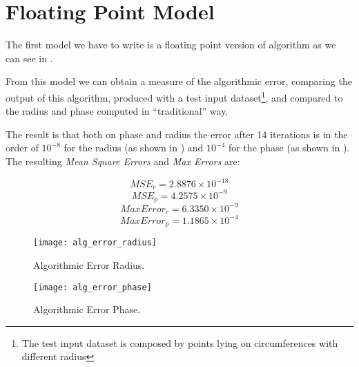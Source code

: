 \section{Floating Point Model}\label{sec:float}

The first model we have to write is a floating point version of \cordic{}
algorithm as we can see in .



From this model we can obtain a measure of the algorithmic error, comparing the
output of this algorithm, produced with a test input dataset\footnote{The test
input dataset is composed by points lying on circumferences with different
radius}, and compared to the radius and phase computed in ``traditional'' way.

The result is that both on phase and radius the error after 14 iterations is in
the order of \(10^{-8}\) for the radius (as shown in
) and \(10^{-4}\) for the phase (as shown in
). The resulting \emph{Mean Square Errors} and
\emph{Max Errors} are:

\[MSE_r = 2.8876\times10^{-18}\]
\[MSE_p = 4.2575\times10^{-9}\]
\[MaxError_r = 6.3350\times10^{-9}\]
\[MaxError_p = 1.1865\times10^{-4}\]


\begin{figure}[htb]
	\texttt{[image: alg\_error\_radius]}
	\caption{Algorithmic Error Radius.}\label{fig:floaterrorradius}
\end{figure}
\begin{figure}[htb]
	\texttt{[image: alg\_error\_phase]}
	\caption{Algorithmic Error Phase.}\label{fig:floaterrorphase}
\end{figure}
